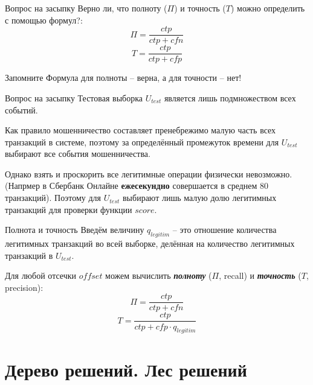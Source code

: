 \documentclass{beamer}
\newcommand{\termdef}[1]{\textbf{\textit{#1}}}
\newcommand{\auditorium}[1]{\color{red}{\textbf{#1}}}
\begin{document}
	\begin{frame}{Вопрос на засыпку}
	Верно ли, что полноту ($\Pi$) и точность ($T$) можно определить с помощью формул?:
	\begin{equation*}
	\Pi = \frac{ctp}{ctp + cfn}
	\end{equation*}
	\begin{equation*}
	T = \frac{ctp}{ctp + cfp}
	\end{equation*}
	 \begin{block}{Запомните}
		Формула для полноты -- верна, а для точности -- нет!
	\end{block}
	\auditorium{Почему?}
	\end{frame}

	\begin{frame}{Вопрос на засыпку}
	Тестовая выборка $U_{test}$ является лишь подмножеством всех событий. 
	
	Как правило мошенничество составляет пренебрежимо малую часть всех транзакций в системе,
	поэтому за определённый промежуток времени для $U_{test}$ выбирают все события мошенничества.
	
	Однако взять и проскорить все легитимные операции физически невозможно.
	(Напрмер в Сбербанк Онлайне \textbf{ежесекундно} совершается в среднем 80 транзакций).
	Поэтому для $U_{test}$ выбирают лишь малую долю легитимных транзакций для проверки функции
	$score$.
	\end{frame}

	\begin{frame}{Полнота и точность}
	Введём величину $q_{legitim}$ -- это отношение количества легитимных транзакций во всей выборке, 
	делённая на количество легитимных транзакций в  $U_{test}$.
	
	Для любой отсечки $offset$ можем вычислить \termdef{полноту} ($\Pi$, recall) и \termdef{точность} ($T$, precision):
		\begin{equation}\label{eq:recall_by_counts}
		\Pi = \frac{ctp}{ctp + cfn}
		\end{equation}
		\begin{equation}\label{eq:presicionl_by_counts}
		T = \frac{ctp}{ctp + cfp \cdot q_{legitim}}
		\end{equation}
	\end{frame}



\section{Дерево решений. Лес решений}\label{section:tree_forest}
\end{document}
